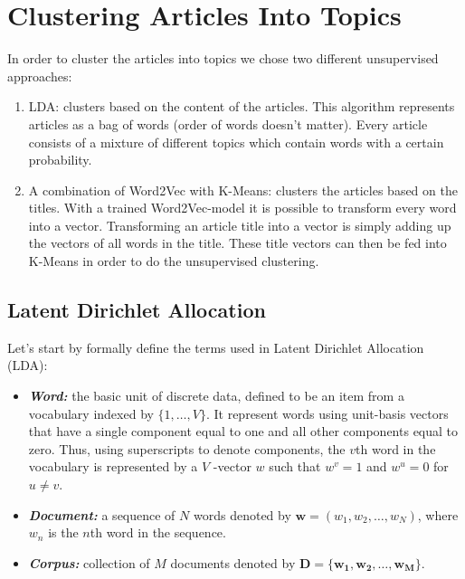 \section{Clustering Articles Into Topics}
\label{sec:topic_detection}

In order to cluster the articles into topics we chose two different unsupervised approaches: 

\begin{enumerate}
\item LDA: clusters based on the content of the articles. This algorithm represents articles as a bag of words (order of words doesn't matter). Every article consists of a mixture of different topics which contain words with a certain probability. 
\item A combination of Word2Vec with K-Means: clusters the articles based on the titles. With a trained Word2Vec-model it is possible to transform every word into a vector. Transforming an article title into a vector is simply adding up the vectors of all words in the title. These title vectors can then be fed into K-Means in order to do the unsupervised clustering.
\end{enumerate}


\subsection{Latent Dirichlet Allocation}
Let's start by formally define the terms used in Latent Dirichlet Allocation (LDA):

\begin{itemize} 
\item \textbf{\textit{Word:}} the basic unit of discrete data, defined to be an item from a vocabulary indexed by
$\{1, \dotsc, V\}$. It represent words using unit-basis vectors that have a single component equal to one and all other components equal to zero. Thus, using superscripts to denote components, the $v$th word in the vocabulary is represented by a $V$ -vector $w$ such that $w^v = 1$ and $w^u = 0$ for $u \neq v$.
\item \textbf{\textit{Document:}}  a sequence of $N$ words denoted by $\mathbf{w} = (w_1, w_2, \dotsc, w_N)$, where $w_n$ is the $n$th word in the sequence.
\item \textbf{\textit{Corpus:}} collection of $M$ documents denoted by $\mathbf{D = \{w_1,w_2, \dotsc, w_M\}}$.
\end{itemize}

